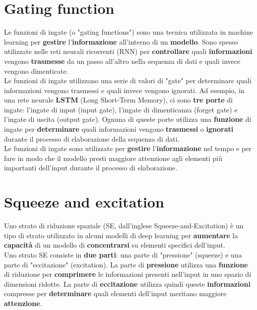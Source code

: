 \documentclass{article}
\begin{document}
\section{Gating function}
Le funzioni di ingate (o "gating functions") sono una tecnica utilizzata in machine learning per \textbf{gestire} l'\textbf{informazione} all'interno di un \textbf{modello}. Sono spesso utilizzate nelle reti neurali ricorrenti (RNN) per \textbf{controllare} quali \textbf{informazioni} vengono \textbf{trasmesse} da un passo all'altro nella sequenza di dati e quali invece vengono dimenticate.\\

Le funzioni di ingate utilizzano una serie di valori di "gate" per determinare quali informazioni vengono trasmessi e quali invece vengono ignorati. Ad esempio, in una rete neurale \textbf{LSTM} (Long Short-Term Memory), ci sono \textbf{tre porte} di ingate: l'ingate di input (input gate), l'ingate di dimenticanza (forget gate) e l'ingate di uscita (output gate). Ognuna di queste porte utilizza una \textbf{funzione} di ingate per \textbf{determinare} quali informazioni vengono \textbf{trasmessi} o \textbf{ignorati} durante il processo di elaborazione della sequenza di dati.\\

Le funzioni di ingate sono utilizzate per \textbf{gestire} l'\textbf{informazione} nel tempo e per fare in modo che il modello presti maggiore attenzione agli elementi più importanti dell'input durante il processo di elaborazione. 

\section{Squeeze and excitation}
Uno strato di riduzione spaziale (SE, dall'inglese Squeeze-and-Excitation) è un tipo di strato utilizzato in alcuni modelli di deep learning per \textbf{aumentare} la \textbf{capacità} di un modello di \textbf{concentrarsi} su elementi specifici dell'input.\\

Uno strato SE consiste in \textbf{due parti}: una parte di "pressione" (squeeze) e una parte di "eccitazione" (excitation). La parte di \textbf{pressione} utilizza una \textbf{funzione} di riduzione per \textbf{comprimere} le informazioni presenti nell'input in uno spazio di dimensioni ridotte. La parte di \textbf{eccitazione} utilizza quindi queste \textbf{informazioni} compresse per \textbf{determinare} quali elementi dell'input meritano maggiore \textbf{attenzione}.\\
\end{document}
